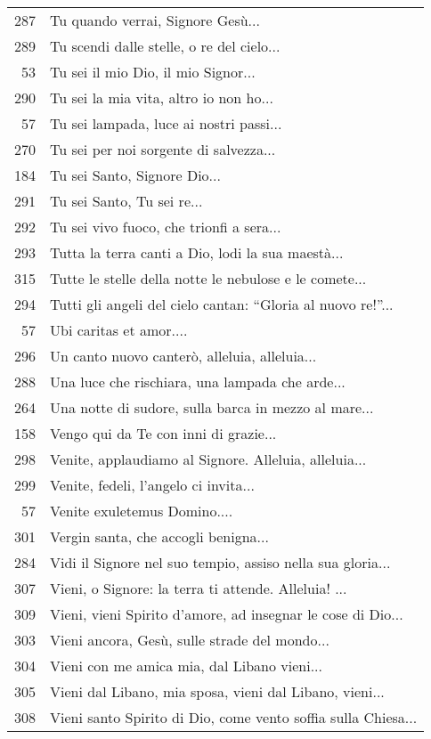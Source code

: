 {\begin{flushleft}
\begin{longtable}{r m{11cm}}
    287 & Tu quando verrai, Signore Gesù...\\
    289 & Tu scendi dalle stelle, o re del cielo...\\
    53 & Tu sei il mio Dio, il mio Signor...\\
    290 & Tu sei la mia vita, altro io non ho...\\
    57 & Tu sei lampada, luce ai nostri passi...\\
    270 & Tu sei per noi sorgente di salvezza...\\
    184 & Tu sei Santo, Signore Dio...\\
    291 & Tu sei Santo, Tu sei re...\\
    292 & Tu sei vivo fuoco, che trionfi a sera...\\
    293 & Tutta la terra canti a Dio, lodi la sua maestà...\\
    315 & Tutte le stelle della notte le nebulose e le comete...\\
    294 & Tutti gli angeli del cielo cantan: ``Gloria al nuovo re!''...\\
    57 & Ubi caritas et amor....\\
    296 & Un canto nuovo canterò, alleluia, alleluia...\\
    288 & Una luce che rischiara, una lampada che arde...\\
    264 & Una notte di sudore, sulla barca in mezzo al mare...\\
    158 & Vengo qui da Te con inni di grazie...\\
    298 & Venite, applaudiamo al Signore. Alleluia, alleluia...\\
    299 & Venite, fedeli, l'angelo ci invita...\\
    57 & Venite exuletemus Domino....\\
    301 & Vergin santa, che accogli benigna...\\
    284 & Vidi il Signore nel suo tempio, assiso nella sua gloria...\\
    307 & Vieni, o Signore: la terra ti attende. Alleluia! ...\\
    309 & Vieni, vieni Spirito d'amore, ad insegnar le cose di Dio...\\
    303 & Vieni ancora, Gesù, sulle strade del mondo...\\
    304 & Vieni con me amica mia, dal Libano vieni...\\
    305 & Vieni dal Libano, mia sposa, vieni dal Libano, vieni...\\
    308 & Vieni santo Spirito di Dio, come vento soffia sulla Chiesa...\\

\end{longtable}
\end{flushleft}}
